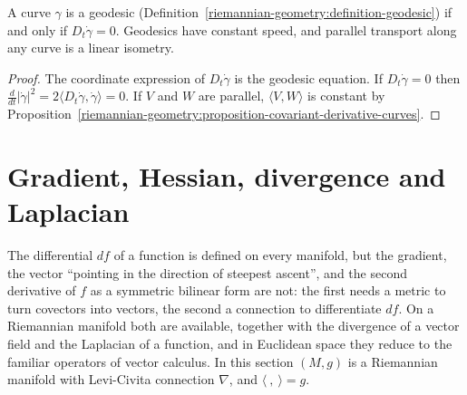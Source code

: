 \begin{proposition}\label{riemannian-geometry:proposition-geodesic-speed}
A curve $\gamma$ is a geodesic (Definition~\ref{riemannian-geometry:definition-geodesic}) if and only if $D_t\dot\gamma = 0$. Geodesics have constant speed, and parallel transport along any curve is a linear isometry.
\end{proposition}

\begin{proof}
The coordinate expression of $D_t\dot\gamma$ is the geodesic equation. If $D_t\dot\gamma = 0$ then $\frac{d}{dt}|\dot\gamma|^2 = 2\langle D_t\dot\gamma, \dot\gamma\rangle = 0$. If $V$ and $W$ are parallel, $\langle V, W\rangle$ is constant by
Proposition~\ref{riemannian-geometry:proposition-covariant-derivative-curves}.
\end{proof}

\section{Gradient, Hessian, divergence and Laplacian}\label{riemannian-geometry:section-gradient}

The differential $df$ of a function is defined on every manifold, but the gradient, the vector ``pointing in the direction of steepest ascent'', and the second derivative of $f$ as a symmetric bilinear
form are not: the first needs a metric to turn covectors into vectors, the second a connection to differentiate $df$. On a Riemannian manifold both are available, together with the divergence of a
vector field and the Laplacian of a function, and in Euclidean space they reduce to the familiar operators of vector calculus. In this section $(M, g)$ is a Riemannian manifold with Levi-Civita
connection $\nabla$, and $\langle\ ,\ \rangle = g$.

